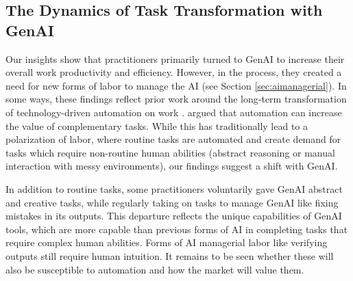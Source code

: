 \subsection{The Dynamics of Task Transformation with GenAI}
Our insights show that practitioners primarily turned to GenAI to increase their overall work productivity and efficiency. However, in the process, they created a need for new forms of labor to manage the AI (see Section \ref{sec:aimanagerial}). In some ways, these findings reflect prior work around the long-term transformation of technology-driven automation on work \cite{autor2003skill}. \cite{autor2015there} argued that automation can increase the value of complementary tasks. 
While this has traditionally lead to a polarization of labor, where routine tasks are automated and create demand for tasks which require non-routine human abilities (abstract reasoning or manual interaction with messy environments), our findings suggest a shift with GenAI.



In addition to routine tasks, some practitioners voluntarily gave GenAI abstract and creative tasks, while regularly taking on tasks to manage GenAI like fixing mistakes in its outputs. This departure reflects the unique capabilities of GenAI tools, which are more capable than previous forms of AI in completing tasks that require complex human abilities. Forms of AI managerial labor like verifying outputs still require human intuition. It remains to be seen whether these will also be susceptible to automation and how the market will value them.


